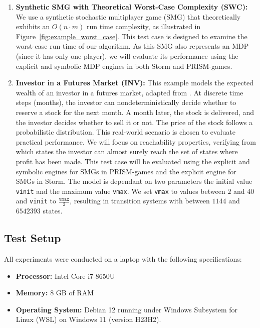 \begin{enumerate}
    \item\label{test:swc} \textbf{Synthetic SMG with Theoretical Worst-Case Complexity (SWC):} 
    We use a synthetic stochastic multiplayer game (SMG) that theoretically exhibits an \(O(n \cdot m)\) run time complexity, as illustrated in Figure~\ref{fig:example_worst_case}. This test case is designed to examine the worst-case run time of our algorithm. As this SMG also represents an MDP (since it has only one player), we will evaluate its performance using the explicit and symbolic MDP engines in both Storm and PRISM-games.

    \item\label{test:inv} \textbf{Investor in a Futures Market (INV):} 
    This example models the expected wealth of an investor in a futures market, adapted from \cite{mciver_results_2003}. At discrete time steps (months), the investor can nondeterministically decide whether to reserve a stock for the next month. A month later, the stock is delivered, and the investor decides whether to sell it or not. The price of the stock follows a probabilistic distribution. This real-world scenario is chosen to evaluate practical performance. We will focus on reachability properties, verifying from which states the investor can almost surely reach the set of states where profit has been made. This test case will be evaluated using the explicit and symbolic engines for SMGs in PRISM-games and the explicit engine for SMGs in Storm. The model is dependant on two parameters the initial value \texttt{vinit} and the maximum value \texttt{vmax}. We set \texttt{vmax} to values between $2$ and $40$ and \texttt{vinit} to $\frac{\texttt{vmax}}{2}$, resulting in transition systems with between $1144$ and $6542393$ states.
\end{enumerate}

\subsection{Test Setup}
\label{subsec:test_setup}

All experiments were conducted on a laptop with the following specifications:

\begin{itemize}
    \item \textbf{Processor:} Intel Core i7-8650U
    \item \textbf{Memory:} 8 GB of RAM
    \item \textbf{Operating System:} Debian 12 running under Windows Subsystem for Linux (WSL) on Windows 11 (version H23H2).
\end{itemize}

